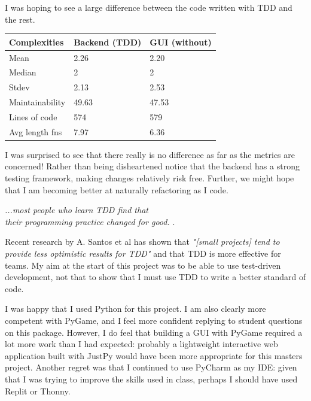 \documentclass[10pt]{article}
\begin{document}
I was hoping to see a large difference between the code written with TDD and the rest.
\begin{center}
\begin{tabular}{|l|l|l|}
\hline
Complexities      & \textbf{Backend (TDD)} & \textbf{GUI (without)} \\ \hline
Mean            & 2.26         & 2.20             \\ \hline
Median          & 2            & 2                \\ \hline
Stdev           & 2.13         & 2.53             \\ \hline \hline
Maintainability & 49.63        & 47.53            \\ \hline
Lines of code   & 574          & 579              \\ \hline
Avg length fns     & 7.97         & 6.36             \\ \hline
\end{tabular}
\end{center}
I was surprised to see that there really is no difference as far as the metrics are concerned! Rather than being disheartened notice that the backend has a strong testing framework, making changes relatively risk free. Further, we might hope that I am becoming better at naturally refactoring as I code. 
\begin{center}
\emph{...most people who learn TDD find that \\
their programming practice changed for good.} \cite[p.xii]{Beck03}.
\end{center}
Recent research by A. Santos et al has shown that \emph{"[small projects] tend to provide less optimistic results for TDD"} and that TDD is more effective for teams.\cite{SVDU21} My aim at the start of this project was to be able to use test-driven development, not that to show that I must use TDD to write a better standard of code.

I was happy that I used Python for this project. I am also clearly more competent with PyGame, and I feel more confident replying to student questions on this package. However, I do feel that building a GUI with PyGame required a lot more work than I had expected: probably a lightweight interactive web application built with JustPy would have been more appropriate for this masters project. Another regret was that I continued to use PyCharm as my IDE: given that I was trying to improve the skills used in class, perhaps I should have used Replit or Thonny.

\
\end{document}
